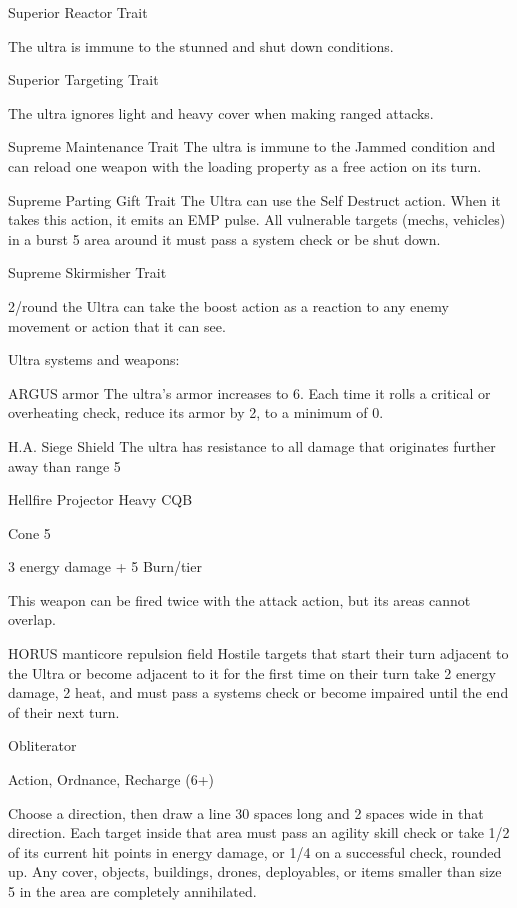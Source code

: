 Superior Reactor  
Trait
 
The ultra is immune to the stunned and shut down conditions.
 

Superior Targeting  
Trait
 
The ultra ignores light and heavy cover when making ranged attacks.
 

Supreme Maintenance  
Trait  
The ultra is immune to the Jammed condition and can reload one weapon with the loading  
property as a free action on its turn.
 

Supreme Parting Gift  
Trait  
The Ultra can use the Self Destruct action. When it takes this action, it emits an EMP pulse. All  
vulnerable targets (mechs, vehicles) in a burst 5 area around it must pass a system check or be  
shut down.
 

Supreme Skirmisher  
Trait
 
2/round the Ultra can take the boost action as a reaction to any enemy movement or action that  
it can see.
 

Ultra systems and weapons:  

ARGUS armor  
The ultra’s armor increases to 6. Each time it rolls a critical or overheating check, reduce its  
armor by 2, to a minimum of 0.
 

H.A. Siege Shield  
The ultra has resistance to all damage that originates further away than range 5
 

Hellfire Projector  
Heavy CQB
 
Cone 5
 
3 energy damage + 5 Burn/tier
 
This weapon can be fired twice with the attack action, but its areas cannot overlap.
 

                                                                                                                   


HORUS manticore repulsion field  
Hostile targets that start their turn adjacent to the Ultra or become adjacent to it for the first time  
on their turn take 2 energy damage, 2 heat, and must pass a systems check or become impaired  
until the end of their next turn.
 

Obliterator
 
Action, Ordnance, Recharge (6+)
 
Choose a direction, then draw a line 30 spaces long and 2 spaces wide in that direction. Each  
target inside that area must pass an agility skill check or take 1/2 of its current hit points in energy  
damage, or 1/4 on a successful check, rounded up. Any cover, objects, buildings, drones,  
deployables, or items smaller than size 5 in the area are completely annihilated.
 


